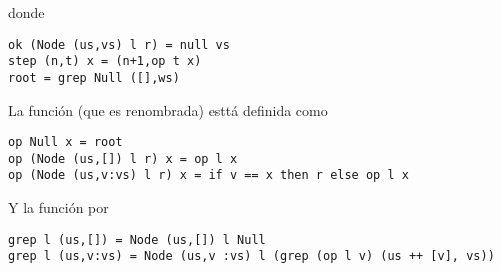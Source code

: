 donde

\begin{verbatim}
ok (Node (us,vs) l r) = null vs
step (n,t) x = (n+1,op t x)
root = grep Null ([],ws)
\end{verbatim}

La función  (que es  renombrada) esttá definida como
\begin{verbatim}
op Null x = root
op (Node (us,[]) l r) x = op l x
op (Node (us,v:vs) l r) x = if v == x then r else op l x
\end{verbatim}

Y la función  por
\begin{verbatim}
grep l (us,[]) = Node (us,[]) l Null
grep l (us,v:vs) = Node (us,v :vs) l (grep (op l v) (us ++ [v], vs))
\end{verbatim}


